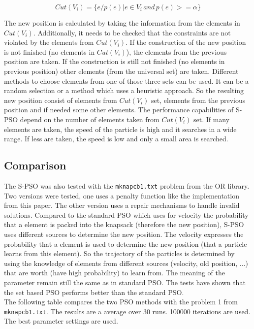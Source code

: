 \documentclass{article}
\begin{document}
\begin{equation}
Cut(V_i) = \{e/p(e)| e \in V_i \, and \, p(e) >= \alpha\}
\end{equation}

The new position is calculated by taking the information from the elements in $Cut(V_i)$. Additionally, it needs to be checked that the constraints are not violated by the elements from $Cut(V_i)$. If the construction of the new position is not finished (no elements in $Cut(V_i)$), the elements from the previous position are taken. If the construction is still not finished (no elements in previous position) other elements (from the universal set) are taken. Different methods to choose elements from one of those three sets can be used. It can be a random selection or a method which uses a heuristic approach. So the resulting new position consist of elements from $Cut(V_i)$ set, elements from the previous position and if needed some other elements. The performance capabilities of S-PSO depend on the number of elements taken from $Cut(V_i)$ set. If many elements are taken, the speed of the particle is high and it searches in a wide range. If less are taken, the speed is low and only a small area is searched.

\subsection{Comparison}
The S-PSO was also tested with the \lstinline$mknapcb1.txt$ problem from the OR library. Two versions were tested, one uses a penalty function like the implementation from this paper. The other version uses a repair mechanisms to handle invalid solutions. Compared to the standard PSO which uses for velocity the probability that a element is packed into the knapsack (therefore the new position), S-PSO uses different sources to determine the new position. The velocity expresses the probability that a element is used to determine the new position (that a particle learns from this element). So the trajectory of the particles is determined by using the knowledge of elements from different sources (velocity, old position, ...) that are worth (have high probability) to learn from. The meaning of the parameter remain still the same as in standard PSO. The tests have shown that the set based PSO performs better than the standard PSO.\\

The following table compares the two PSO methods with the problem 1 from \lstinline$mknapcb1.txt$. The results are a average over 30 runs. 100000 iterations are used. The best parameter settings are used. \\ 
\end{document}
